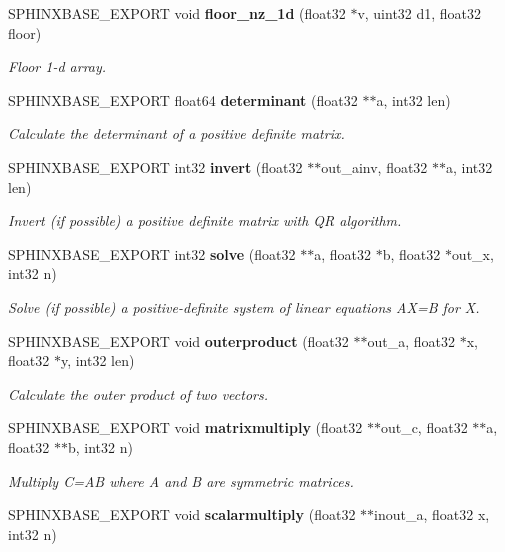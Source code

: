 \begin{DoxyCompactItemize}
S\-P\-H\-I\-N\-X\-B\-A\-S\-E\-\_\-\-E\-X\-P\-O\-R\-T void {\bf floor\-\_\-nz\-\_\-1d} (float32 $\ast$v, uint32 d1, float32 floor)
\begin{DoxyCompactList}\small\item\em Floor 1-\/d array. \end{DoxyCompactList}\item 
S\-P\-H\-I\-N\-X\-B\-A\-S\-E\-\_\-\-E\-X\-P\-O\-R\-T float64 {\bf determinant} (float32 $\ast$$\ast$a, int32 len)
\begin{DoxyCompactList}\small\item\em Calculate the determinant of a positive definite matrix. \end{DoxyCompactList}\item 
S\-P\-H\-I\-N\-X\-B\-A\-S\-E\-\_\-\-E\-X\-P\-O\-R\-T int32 {\bf invert} (float32 $\ast$$\ast$out\-\_\-ainv, float32 $\ast$$\ast$a, int32 len)
\begin{DoxyCompactList}\small\item\em Invert (if possible) a positive definite matrix with Q\-R algorithm. \end{DoxyCompactList}\item 
S\-P\-H\-I\-N\-X\-B\-A\-S\-E\-\_\-\-E\-X\-P\-O\-R\-T int32 {\bf solve} (float32 $\ast$$\ast$a, float32 $\ast$b, float32 $\ast$out\-\_\-x, int32 n)
\begin{DoxyCompactList}\small\item\em Solve (if possible) a positive-\/definite system of linear equations A\-X=B for X. \end{DoxyCompactList}\item 
S\-P\-H\-I\-N\-X\-B\-A\-S\-E\-\_\-\-E\-X\-P\-O\-R\-T void {\bf outerproduct} (float32 $\ast$$\ast$out\-\_\-a, float32 $\ast$x, float32 $\ast$y, int32 len)
\begin{DoxyCompactList}\small\item\em Calculate the outer product of two vectors. \end{DoxyCompactList}\item 
S\-P\-H\-I\-N\-X\-B\-A\-S\-E\-\_\-\-E\-X\-P\-O\-R\-T void {\bf matrixmultiply} (float32 $\ast$$\ast$out\-\_\-c, float32 $\ast$$\ast$a, float32 $\ast$$\ast$b, int32 n)
\begin{DoxyCompactList}\small\item\em Multiply C=A\-B where A and B are symmetric matrices. \end{DoxyCompactList}\item 
S\-P\-H\-I\-N\-X\-B\-A\-S\-E\-\_\-\-E\-X\-P\-O\-R\-T void {\bf scalarmultiply} (float32 $\ast$$\ast$inout\-\_\-a, float32 x, int32 n)
$$
\end{DoxyCompactItemize}
